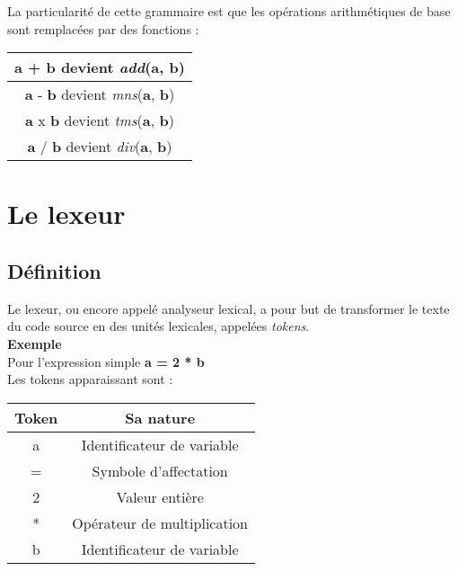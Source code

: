 \documentclass[a4paper]{article}
\begin{document}
La particularité de cette grammaire est que les opérations arithmétiques de base sont remplacées par des fonctions :\\
\begin{center}
\begin{tabular}{ | c | }
    \hline
    \textbf{a} + \textbf{b} devient \textit{add}(\textbf{a}, \textbf{b})\\
    \hline
    \textbf{a} - \textbf{b} devient \textit{mns}(\textbf{a}, \textbf{b})\\
    \hline
    \textbf{a} x \textbf{b} devient \textit{tms}(\textbf{a}, \textbf{b})\\
    \hline
    \textbf{a} / \textbf{b} devient \textit{div}(\textbf{a}, \textbf{b})\\
    \hline
\end{tabular}
\end{center}


\clearpage{}


\section{Le lexeur}

\subsection{Définition}

 Le lexeur, ou encore appelé analyseur lexical, a pour but de transformer le texte du code source en des unités lexicales, appelées \textit{tokens}. \\
 
\textbf{Exemple} \\
    Pour l'expression simple \textbf{a = 2 * b} \\
    Les tokens apparaissant sont : \\
    \begin{center}
    \begin{tabular}{ | c | c | }
    \hline
    \textbf{Token} & \textbf{Sa nature} \\ 
    \hline
    a & Identificateur de variable \\ 
    \hline
    = & Symbole d'affectation \\  
    \hline
    2 & Valeur entière \\
    \hline
    * & Opérateur de multiplication \\
    \hline
    b & Identificateur de variable \\
    \hline
\end{tabular}
\end{center}
\end{document}
